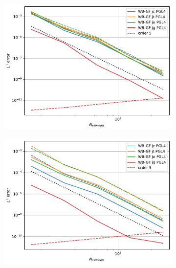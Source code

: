 \documentclass[pt12]{beamer}
\begin{document}
\begin{frame}[label=NumericalResultsWithoutWBmonodimensionalcasesSW]
\begin{figure}
\begin{subfigure}[b]{0.30\textwidth}
         \label{convergence_comp_jumps_sub}
     \end{subfigure}
     \begin{subfigure}[b]{0.30\textwidth}
         \centering
         \includegraphics[width=\textwidth]{alb_trans_convergenceWB-GF.pdf}
         \label{convergence_comp_jumps_trans}
     \end{subfigure}
     \begin{subfigure}[b]{0.30\textwidth}
         \centering
         \includegraphics[width=\textwidth]{alb_sup_convergenceWB-GF.pdf}
         \label{convergence_comp_jumps_super}
     \end{subfigure}
\end{figure}

\end{frame}
\end{document}
